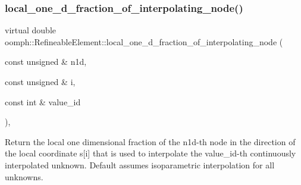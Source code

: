 \mbox{\label{classoomph_1_1RefineableElement_ac4e4ae5374154855ae9b072c6269f76e}} 
\subsubsection{\texorpdfstring{local\+\_\+one\+\_\+d\+\_\+fraction\+\_\+of\+\_\+interpolating\+\_\+node()}{local\_one\_d\_fraction\_of\_interpolating\_node()}}
{\footnotesize\ttfamily virtual double oomph\+::\+Refineable\+Element\+::local\+\_\+one\+\_\+d\+\_\+fraction\+\_\+of\+\_\+interpolating\+\_\+node (\begin{DoxyParamCaption}\item[{const unsigned \&}]{n1d,  }\item[{const unsigned \&}]{i,  }\item[{const int \&}]{value\+\_\+id }\end{DoxyParamCaption})\hspace{0.3cm}{\ttfamily [inline]}, {\ttfamily [virtual]}}



Return the local one dimensional fraction of the n1d-\/th node in the direction of the local coordinate s\mbox{[}i\mbox{]} that is used to interpolate the value\+\_\+id-\/th continuously interpolated unknown. Default assumes isoparametric interpolation for all unknowns. 



